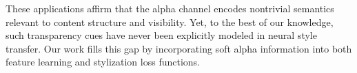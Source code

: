 \documentclass[letterpaper]{article} %
\begin{document}
These applications affirm that the alpha channel encodes nontrivial semantics relevant to content structure and visibility. Yet, to the best of our knowledge, such transparency cues have never been explicitly modeled in neural style transfer. Our work fills this gap by incorporating soft alpha information into both feature learning and stylization loss functions.






\end{document}
